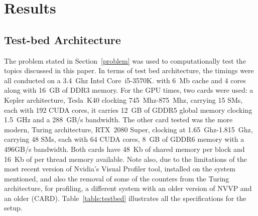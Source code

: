 \clearpage
\chapter{Results}

\section{Test-bed Architecture}

The problem stated in Section~\ref{problem} was used to computationally test the topics discussed in this paper. In terms of test bed architecture, the timings were all conducted on a 3.4~Ghz Intel Core~i5-3570K. with 6~Mb cache and 4 cores along with 16~GB of DDR3 memory. For the GPU times, two cards were used: a Kepler architecture, Tesla~K40 clocking 745~Mhz-875~Mhz, carrying 15 SMs, each with 192 CUDA cores, it carries 12~GB of GDDR5 global memory clocking 1.5~GHz and a 288~GB/s bandwidth. The other card tested was the more modern, Turing architecture, RTX~2080 Super, clocking at 1.65~Ghz-1.815~Ghz, carrying 48 SMs, each with 64 CUDA cores, 8~GB of GDDR6 memory with a 496GB/s bandwidth. Both cards have 48~Kb of shared memory per block and 16~Kb of per thread memory available. Note also, due to the limitations of the most recent version of Nvidia's Visual Profiler tool, installed on the system mentioned, and also the removal of some of the counters from the Turing architecture, for profiling, a different system with an older version of NVVP and an older (CARD). Table~\ref{table:testbed} illustrates all the specifications for the setup.
\begin{table}
    \begin{center}
    \caption{Testbed architecture.}
	\label{table:testbed}
	\end{center}
\end{table}
    
